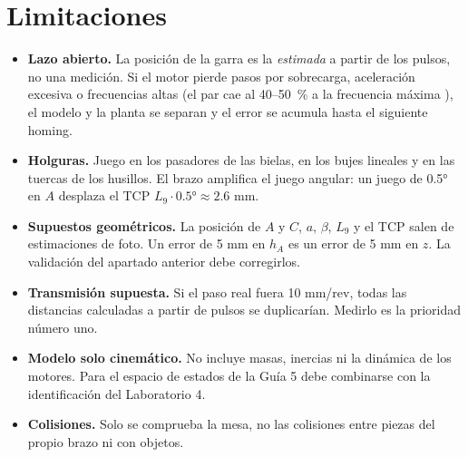 \documentclass[a4paper,12pt]{article}
\begin{document}
\section{Limitaciones}
\begin{itemize}
\item \textbf{Lazo abierto.} La posición de la garra es la \emph{estimada} a partir de los pulsos, no
      una medición. Si el motor pierde pasos por sobrecarga, aceleración excesiva o frecuencias altas (el par
      cae al 40--50~\% a la frecuencia máxima \cite{manual}), el modelo y la planta se separan y el error se
      acumula hasta el siguiente homing.
\item \textbf{Holguras.} Juego en los pasadores de las bielas, en los bujes lineales y en las tuercas de los
      husillos. El brazo amplifica el juego angular: un juego de 0.5° en $A$ desplaza el TCP
      $L_9 \cdot 0.5° \approx 2.6$ mm.
\item \textbf{Supuestos geométricos.} La posición de $A$ y $C$, $a$, $\beta$, $L_9$ y el TCP salen de
      estimaciones de foto. Un error de 5 mm en $h_A$ es un error de 5 mm en $z$. La validación del
      apartado anterior debe corregirlos.
\item \textbf{Transmisión supuesta.} Si el paso real fuera 10 mm/rev, todas las distancias calculadas a
      partir de pulsos se duplicarían. Medirlo es la prioridad número uno.
\item \textbf{Modelo solo cinemático.} No incluye masas, inercias ni la dinámica de los motores. Para el
      espacio de estados de la Guía 5 debe combinarse con la identificación del Laboratorio 4.
\item \textbf{Colisiones.} Solo se comprueba la mesa, no las colisiones entre piezas del propio brazo ni
      con objetos.
\end{itemize}

\end{document}
